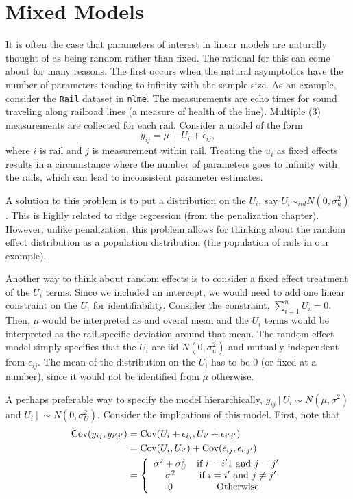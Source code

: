 \section{Mixed Models}


It is often the case that parameters of interest in linear
models are naturally thought of as being random rather
than fixed. The rational for this can come about for many reasons.
The first occurs when the natural asymptotics have the number
of parameters tending to infinity with the sample size. As
an example, consider the \texttt{Rail} dataset in
\texttt{nlme}. The measurements are echo times for sound
traveling along railroad lines (a measure of health of the
line). Multiple (3) measurements are collected for each rail.
Consider a model of the form
$$
y_{ij} = \mu + U_i + \epsilon_{ij},
$$
where $i$ is rail and $j$ is measurement within rail. 
Treating the $u_i$ as fixed effects results in a
circumstance where the number of parameters goes
to infinity with the rails, which can lead to 
inconsistent parameter estimates.

A solution to this problem is to put a distribution on
the $U_i$, say $U_i \sim_{iid} N(0, \sigma^2_u)$. This
is highly related to ridge regression (from the penalization
chapter). However, unlike penalization, this problem allows
for thinking about the random effect distribution as a population
distribution (the population of rails in our example). 

Another way to think about random effects is to
consider a fixed effect treatment of the $U_i$ terms. Since
we included an intercept, we would need to add one linear
constraint on the $U_i$ for identifiability. Consider the
constraint, $\sum_{i=1}^n U_i = 0$. Then, $\mu$ would be
interpreted as and overal mean and the $U_i$ terms would
be interpreted as the rail-specific deviation around
that mean. The random effect model simply specifies that
the $U_i$ are iid $N(0, \sigma^2_u)$ and mutually
independent from $\epsilon_{ij}$. The mean of the distribution
on the $U_i$ has to be 0 (or fixed at a number), since it would
not be identified from $\mu$ otherwise. 

A perhaps preferable
way to specify the model hierarchically, 
$y_{ij} ~|~ U_i \sim N(\mu, \sigma^2)$ and $U_i ~|~ \sim N(0, \sigma^2_U)$. 
Consider the implications of this model. First, note that
\begin{align}
\mbox{Cov}(y_{ij}, y_{i'j'}) & = \mbox{Cov}(U_i + \epsilon_{ij}, U_{i'} + \epsilon_{i'j'})\\
& = \mbox{Cov}(U_i, U_{i'}) + \mbox{Cov}(\epsilon_{ij}, \epsilon_{i'j'}) \\
& = \left\{
\begin{array}{cc}
\sigma^2 + \sigma^2_U & \mbox{if}~ i=i'1 ~\mbox{and}~ j = j' \\
\sigma^2 & \mbox{if}~ i=i' ~\mbox{and}~ j\neq j' \\
0 & \mbox{Otherwise}
\end{array}
\right.
\end{align}

